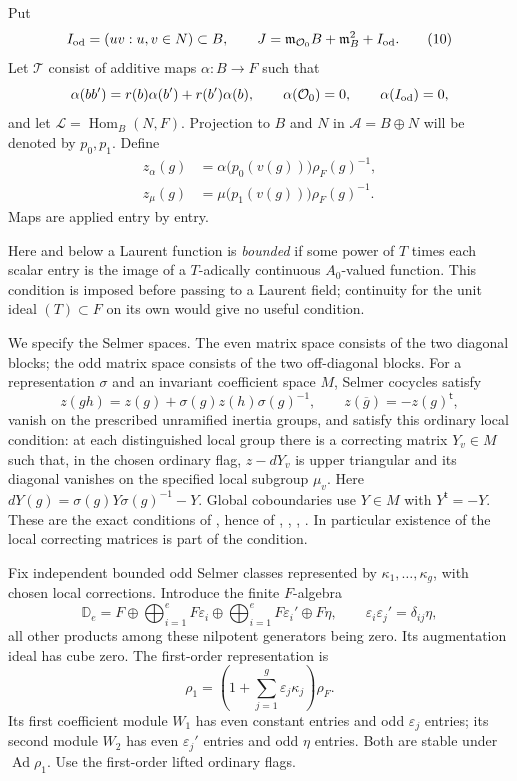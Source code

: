 Put
\[
 I_{\rm od}=(uv:u,v\in N)\subset B,\qquad
 J=\mathfrak m_{\mathcal O_0}B+\mathfrak m_B^2+I_{\rm od}.
                                                               \tag{10}
\]
Let $\mathcal T$ consist of additive maps $\alpha:B\to F$ such that
\[
 \alpha(bb')=r(b)\alpha(b')+r(b')\alpha(b),\qquad
 \alpha(\mathcal O_0)=0,\qquad \alpha(I_{\rm od})=0,
\]
and let $\mathcal L=\operatorname{Hom}_B(N,F)$.
Projection to $B$ and $N$ in $\mathcal A=B\oplus N$ will be
denoted by $p_0,p_1$.  Define
\[
 \begin{split}
 z_\alpha(g)&=\alpha\bigl(p_0(v(g))\bigr)\rho_F(g)^{-1},\\
 z_\mu(g)&=\mu\bigl(p_1(v(g))\bigr)\rho_F(g)^{-1}.
 \end{split}                                                    \tag{11}
\]
Maps are applied entry by entry.

Here and below a Laurent function is \emph{bounded} if some
power of $T$ times each scalar entry is the image of a
$T$-adically continuous $A_0$-valued function.  This condition is
imposed before passing to a Laurent field; continuity for the
unit ideal $(T)\subset F$ on its own would give no useful condition.

We specify the Selmer spaces.  The even matrix space consists
of the two diagonal blocks; the odd matrix space consists of
the two off-diagonal blocks.  For a representation $\sigma$
and an invariant coefficient space $M$, Selmer cocycles satisfy
\[
 z(gh)=z(g)+\sigma(g)z(h)\sigma(g)^{-1},\qquad
 z(\overline g)=-z(g)^{\mathsf t},
\]
vanish on the prescribed unramified inertia groups, and satisfy
this ordinary local condition: at each distinguished local
group there is a correcting matrix $Y_v\in M$ such that, in
the chosen ordinary flag, $z-dY_v$ is upper triangular and its
diagonal vanishes on the specified local subgroup $\mu_v$.
Here $dY(g)=\sigma(g)Y\sigma(g)^{-1}-Y$.
Global coboundaries use $Y\in M$ with $Y^{\mathsf t}=-Y$.
These are the exact conditions of , hence of
, , , .
In particular existence of the local correcting matrices is
part of the condition.

Fix independent bounded odd Selmer classes represented by
$\kappa_1,\ldots,\kappa_g$, with chosen local corrections.
Introduce the finite $F$-algebra
\[
 \mathbb D_e
 =F\oplus\bigoplus_{i=1}^eF\varepsilon_i
       \oplus\bigoplus_{i=1}^eF\varepsilon_i'
       \oplus F\eta ,
 \qquad \varepsilon_i\varepsilon_j'=\delta_{ij}\eta,             \tag{12}
\]
all other products among these nilpotent generators being zero.
Its augmentation ideal has cube zero.
The first-order representation is
\[
       \rho_1=(1+\sum_{j=1}^g\varepsilon_j\kappa_j)\rho_F .
\]
Its first coefficient module $W_1$ has even constant entries and
odd $\varepsilon_j$ entries; its second module $W_2$ has even
$\varepsilon_j'$ entries and odd $\eta$ entries.
Both are stable under $\operatorname{Ad}\rho_1$.
Use the first-order lifted ordinary flags.

